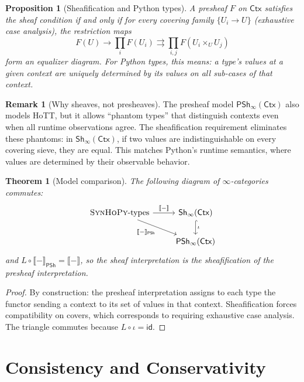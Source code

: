 \documentclass[11pt,a4paper]{report}
\theoremstyle{definition}
\newtheorem{remark}[definition]{Remark}
\theoremstyle{plain}
\newtheorem{theorem}[definition]{Theorem}
\newtheorem{proposition}[definition]{Proposition}
\newcommand{\den}[1]{\llbracket #1 \rrbracket}
\newcommand{\Ctx}{\mathsf{Ctx}}
\newcommand{\synhopy}{\textsc{SynHoPy}}
\newcommand{\Sh}{\mathsf{Sh}}
\begin{document}
\begin{proposition}[Sheafification and Python types]
\label{prop:sheafification}
A presheaf $F$ on $\Ctx$ satisfies the sheaf condition if and only if for
every covering family $\{U_i \to U\}$ (exhaustive case analysis), the
restriction maps
\[
  F(U) \to \prod_i F(U_i) \rightrightarrows \prod_{i,j} F(U_i \times_U U_j)
\]
form an equalizer diagram.  For Python types, this means: a type's values at
a given context are uniquely determined by its values on all sub-cases of that
context.
\end{proposition}

\begin{remark}[Why sheaves, not presheaves]
The presheaf model $\mathsf{PSh}_\infty(\Ctx)$ also models HoTT, but it allows
``phantom types'' that distinguish contexts even when all runtime observations
agree.  The sheafification requirement eliminates these phantoms:
in $\Sh_\infty(\Ctx)$, if two values are indistinguishable on every covering
sieve, they are equal.  This matches Python's runtime semantics, where values
are determined by their observable behavior.
\end{remark}

\begin{theorem}[Model comparison]
\label{thm:model-comparison}
The following diagram of $\infty$-categories commutes:
\[
\begin{tikzcd}
  \synhopy\text{-types} \ar[r, "\den{-}"] \ar[dr, "\den{-}_{\mathsf{PSh}}"'] &
  \Sh_\infty(\Ctx) \ar[d, hook, "\iota"] \\
  & \mathsf{PSh}_\infty(\Ctx)
\end{tikzcd}
\]
and $L \circ \den{-}_{\mathsf{PSh}} = \den{-}$, so the sheaf interpretation is
the sheafification of the presheaf interpretation.
\end{theorem}
\begin{proof}
By construction: the presheaf interpretation assigns to each type the functor
sending a context to its set of values in that context.  Sheafification forces
compatibility on covers, which corresponds to requiring exhaustive case analysis.
The triangle commutes because $L \circ \iota = \mathsf{id}$.
\end{proof}


\chapter{Consistency and Conservativity}
\label{ch:consistency}
\end{document}
